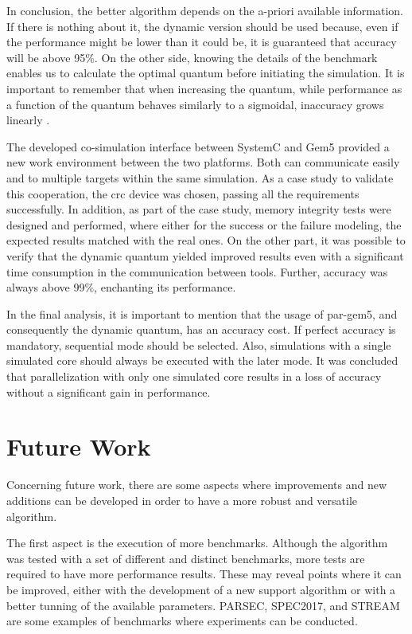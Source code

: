 In conclusion, the better algorithm depends on the a-priori available information. If there is nothing about it, the dynamic version should be 
used because, even if the performance might be lower than it could be, it is guaranteed that accuracy will be above 95\%. On the other side,
knowing the details of the benchmark enables us to calculate the optimal quantum before initiating the simulation. It is important to 
remember that when increasing the quantum, while performance as a function of the quantum behaves similarly to a sigmoidal, inaccuracy 
grows linearly \cite*{BeyondQuantumTDSim}. 

The developed co-simulation interface between SystemC and Gem5 provided a new work environment between the two platforms. Both can communicate
easily and to multiple targets within the same simulation. As a case study to validate this cooperation, the \gls{crc} device was chosen, 
passing all the requirements successfully. In addition, as part of the case study, 
memory integrity tests were designed and performed, where either for the success or the failure modeling, the expected results matched
with the real ones. On the other part, it was possible to verify that the dynamic quantum yielded improved results even with a significant 
time consumption in the communication between tools. Further, accuracy was always above 99\%, enchanting its performance. 

In the final analysis, it is important to mention that the usage of par-gem5, and consequently the dynamic quantum, has an accuracy cost. If 
perfect accuracy is mandatory, sequential mode should be selected. Also, simulations with a single simulated core should always be 
executed with the later mode. It was concluded that parallelization with only one simulated core results in a loss of accuracy 
without a significant gain in performance.


\section{Future Work}

Concerning future work, there are some aspects where improvements and new additions can be developed in order to have a more robust 
and versatile algorithm.

The first aspect is the execution of more benchmarks. Although the algorithm was tested with a set of different and distinct benchmarks, 
more tests are required to have more performance results. These may reveal points where it can be improved, either with the development
of a new support algorithm or with a better tunning of the available parameters. PARSEC, SPEC2017, and STREAM are some examples of 
benchmarks where experiments can be conducted. 

